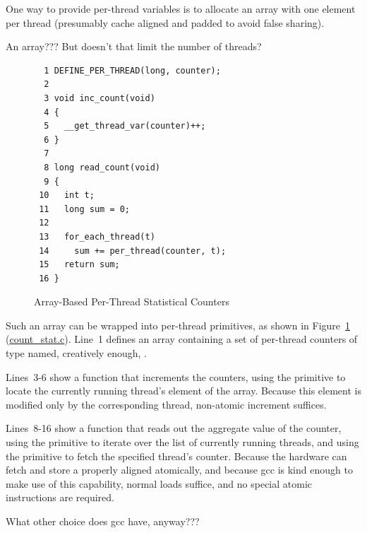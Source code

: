 One way to provide per-thread variables is to allocate an array with
one element per
thread (presumably cache aligned and padded to avoid false sharing).

\QuickQuiz{}
	An array???
	But doesn't that limit the number of threads?
 \QuickQuizEnd

\begin{figure}[tbp]
{ \scriptsize
\begin{verbatim}
  1 DEFINE_PER_THREAD(long, counter);
  2 
  3 void inc_count(void)
  4 {
  5   __get_thread_var(counter)++;
  6 }
  7 
  8 long read_count(void)
  9 {
 10   int t;
 11   long sum = 0;
 12 
 13   for_each_thread(t)
 14     sum += per_thread(counter, t);
 15   return sum;
 16 }
\end{verbatim}
}
\caption{Array-Based Per-Thread Statistical Counters}
\label{fig:count:Array-Based Per-Thread Statistical Counters}
\end{figure}

Such an array can be wrapped into per-thread primitives, as shown in
Figure~\ref{fig:count:Array-Based Per-Thread Statistical Counters}
(\url{count_stat.c}).
Line~1 defines an array containing a set of per-thread counters of
type  named, creatively enough, .

Lines~3-6 show a function that increments the counters, using the
 primitive to locate the currently running
thread's element of the  array.
Because this element is modified only by the corresponding thread,
non-atomic increment suffices.

Lines~8-16 show a function that reads out the aggregate value of the counter,
using the  primitive to iterate over the list of
currently running threads, and using the  primitive
to fetch the specified thread's counter.
Because the hardware can fetch and store a properly aligned 
atomically, and because gcc is kind enough to make use of this capability,
normal loads suffice, and no special atomic instructions are required.

\QuickQuiz{}
	What other choice does gcc have, anyway???
 \QuickQuizEnd


